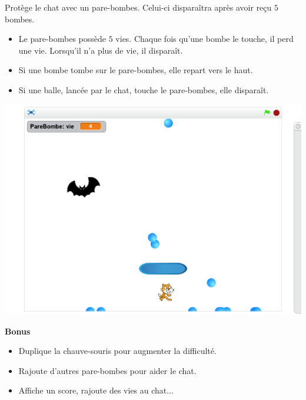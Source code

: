 \documentclass[class=report,crop=false, 12pt]{standalone}
\begin{document}
\begin{activite}

Protège le chat avec un pare-bombes. Celui-ci disparaîtra après avoir reçu $5$ bombes.
\begin{itemize}
  \item Le pare-bombes possède $5$ vies. Chaque fois qu'une bombe le touche, il perd une vie. Lorsqu'il n'a plus de vie, il disparaît.
  
  \item Si une bombe tombe sur le pare-bombes, elle repart vers le haut.

  \item Si une balle, lancée par le chat, touche le pare-bombes, elle disparaît.
\end{itemize}


\begin{center}
  \includegraphics[scale=\scaleecran]{ecran-10-ex3} 
\end{center}


\textbf{Bonus}

\begin{itemize}
  \item Duplique la chauve-souris pour augmenter la difficulté.
  
  \item Rajoute d'autres pare-bombes pour aider le chat.
  
  \item Affiche un score, rajoute des vies au chat...

\end{itemize}
  
\end{activite}
\end{document}
